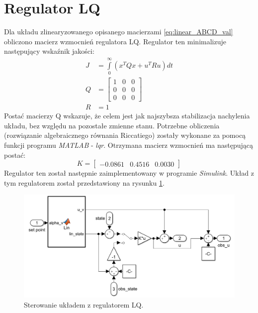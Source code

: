 \documentclass[11pt,a4paper]{article}
\begin{document}
\section{Regulator LQ}
\label{sec:regulatorlq}
Dla układu zlinearyzowanego opisanego macierzami \eqref{eq:linear_ABCD_val} obliczono macierz wzmocnień regulatora LQ. Regulator ten minimalizuje następujący wskaźnik jakości:
\begin{equation}
\begin{aligned}
J&=\int\limits_0^{\infty}(x^TQx+u^TRu)dt\\
Q&=\begin{bmatrix}
1 & 0 & 0\\
0 & 0 & 0\\
0 & 0 & 0
\end{bmatrix}\\
R&=1
\end{aligned}
\end{equation}
Postać macierzy Q wskazuje, że celem jest jak najszybsza stabilizacja nachylenia układu, bez względu na pozostałe zmienne stanu. Potrzebne obliczenia (rozwiązanie algebraicznego równania Riccatiego) zostały wykonane za pomocą funkcji programu \textit{MATLAB} - \textit{lqr}. Otrzymana macierz wzmocnień ma następującą postać:
\begin{equation}
K=\begin{bmatrix}
-0.0861 & 0.4516 & 0.0030
\end{bmatrix}
\end{equation}
Regulator ten został następnie zaimplementowany w programie \textit{Simulink}. Układ z tym regulatorem został przedstawiony na rysunku \ref{fig:helikopter_lq}.

\begin{figure}[H]
	\centering
	\includegraphics[width=5.9in]{Figures/helikopter_lq.png}
	\caption{Sterowanie układem z regulatorem LQ.}
	\label{fig:helikopter_lq}
\end{figure}
\end{document}
